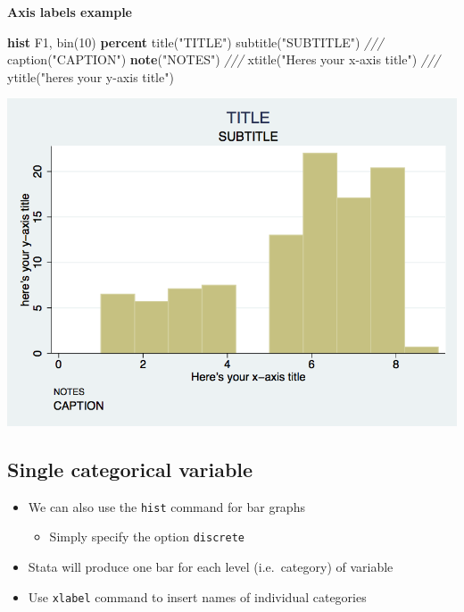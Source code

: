 \documentclass[
]{book}
\newenvironment{Shaded}{\begin{snugshade}}{\end{snugshade}}
\newcommand{\BaseNTok}[1]{\textcolor[rgb]{0.00,0.00,0.81}{#1}}
\newcommand{\CommentTok}[1]{\textcolor[rgb]{0.56,0.35,0.01}{\textit{#1}}}
\newcommand{\KeywordTok}[1]{\textcolor[rgb]{0.13,0.29,0.53}{\textbf{#1}}}
\newcommand{\NormalTok}[1]{#1}
\newcommand{\StringTok}[1]{\textcolor[rgb]{0.31,0.60,0.02}{#1}}
\providecommand{\tightlist}{%
  \setlength{\itemsep}{0pt}\setlength{\parskip}{0pt}}
\begin{document}
\textbf{Axis labels example}

\begin{Shaded}
\begin{Highlighting}[]
\KeywordTok{hist}\NormalTok{ F1, }\BaseNTok{bin}\NormalTok{(10) }\KeywordTok{percent} \BaseNTok{title}\NormalTok{(}\StringTok{"TITLE"}\NormalTok{) }\BaseNTok{subtitle}\NormalTok{(}\StringTok{"SUBTITLE"}\NormalTok{) }\CommentTok{///}
    \BaseNTok{caption}\NormalTok{(}\StringTok{"CAPTION"}\NormalTok{) }\KeywordTok{note}\NormalTok{(}\StringTok{"NOTES"}\NormalTok{) }\CommentTok{///}
    \BaseNTok{xtitle}\NormalTok{(}\StringTok{"Here\textquotesingle{}s your x{-}axis title"}\NormalTok{) }\CommentTok{///}
    \BaseNTok{ytitle}\NormalTok{(}\StringTok{"here\textquotesingle{}s your y{-}axis title"}\NormalTok{)}
\end{Highlighting}
\end{Shaded}

\includegraphics{Stata/StataGraphics/images/hist2.png}

\hypertarget{single-categorical-variable}{%
\subsection{Single categorical variable}\label{single-categorical-variable}}

\begin{itemize}
\tightlist
\item
  We can also use the \texttt{hist} command for bar graphs

  \begin{itemize}
  \tightlist
  \item
    Simply specify the option \texttt{discrete}
  \end{itemize}
\item
  Stata will produce one bar for each level (i.e.~category) of variable
\item
  Use \texttt{xlabel} command to insert names of individual categories
\end{itemize}
\end{document}
